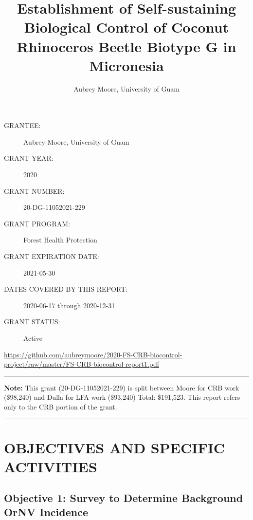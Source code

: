 \documentclass[12pt,letterpaper,english,bibliography=totocnumbered,abstract=on]{scrartcl}
\begin{document}
\titlehead{US Forest Service Forest Health Protection Grant Progess Report 1}
\title{Establishment of Self-sustaining Biological Control of Coconut Rhinoceros Beetle Biotype G in Micronesia}
\author{Aubrey Moore, University of Guam}
\maketitle
\begin{description}	
	\item[GRANTEE:] Aubrey Moore, University of Guam 
	\item[GRANT YEAR:] 2020
	\item[GRANT NUMBER:] 20-DG-11052021-229
	\item[GRANT PROGRAM:] Forest Health Protection
	\item[GRANT EXPIRATION DATE:] 2021-05-30
	\item[DATES COVERED BY THIS REPORT:] 2020-06-17 through 2020-12-31
	\item[GRANT STATUS:] Active
\end{description}	

\begin{footnotesize}
\url{https://github.com/aubreymoore/2020-FS-CRB-biocontrol-project/raw/master/FS-CRB-biocontrol-report1.pdf}
\end{footnotesize}


\newpage{}
\tableofcontents{}

\newpage
\listoftodos

\newpage

\hrule
\medskip
\textbf{Note:} This grant (20-DG-11052021-229) is split between Moore for CRB work (\$98,240) and Dulla for LFA work (\$93,240) Total: \$191,523. This report refers only to the CRB portion of the grant.
\medskip
\hrule

\section{OBJECTIVES AND SPECIFIC ACTIVITIES} 


\subsection{Objective 1:  Survey to Determine Background OrNV Incidence} 
\end{document}
